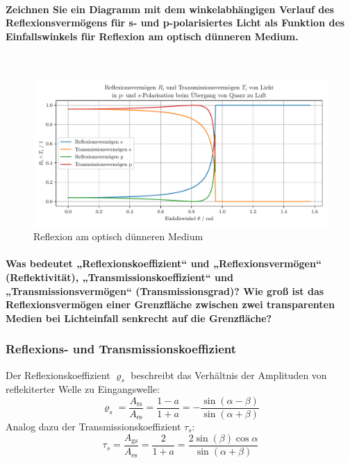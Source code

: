\documentclass[a4paper, 11pt, ngerman, parskip=half-]{scrartcl}
\newcommand{\myparagraph}[1]{\paragraph{#1}\mbox{}\\}
\begin{document}
\myparagraph{Zeichnen Sie ein Diagramm mit dem winkelabhängigen Verlauf des Reflexionsvermögens für s- und p-polarisiertes Licht als Funktion des Einfallswinkels für Reflexion am optisch dünneren Medium.}
%
\begin{figure}[H]
    \centering
    \begin{samepage}
        \includegraphics[width=\textwidth]{image/15/Quarz_zu_Luft.pdf}
        \caption{Reflexion am optisch dünneren Medium}
        \label{fig:reflexion_duenn}
    \end{samepage}
\end{figure}


\paragraph{Was bedeutet „Reflexionskoeffizient“ und „Reflexionsvermögen“ (Reflektivität), „Transmissionskoeffizient“ und „Transmissionsvermögen“ (Transmissionsgrad)? Wie groß ist das Reflexionsvermögen einer Grenzfläche zwischen zwei transparenten Medien bei Lichteinfall senkrecht auf die Grenzfläche?}
%
\subsubsection*{Reflexions- und Transmissionskoeffizient}
Der Reflexionskoeffizient $\varrho_s$ beschreibt das Verhältnis der Amplituden von reflekiterter Welle zu Eingangswelle:
%
\begin{equation}
    \label{eq:reflexionskoeffizient}
    \varrho_s = \frac{A_{\text{rs}}}{A_{\text{es}}} = \frac{1-a}{1+a} = -\frac{\sin (\alpha - \beta)}{\sin (\alpha + \beta)}
\end{equation}
%
Analog dazu der Transmissionskoeffizient $\tau_s$:
%
\begin{equation}
    \label{eq:transmissionskoeffizient}
    \tau_s = \frac{A_{\text{gs}}}{A_{\text{es}}} = \frac{2}{1+a} = \frac{2 \sin (\beta) \cos{\alpha}}{\sin (\alpha + \beta)}
\end{equation}
%
\end{document}
